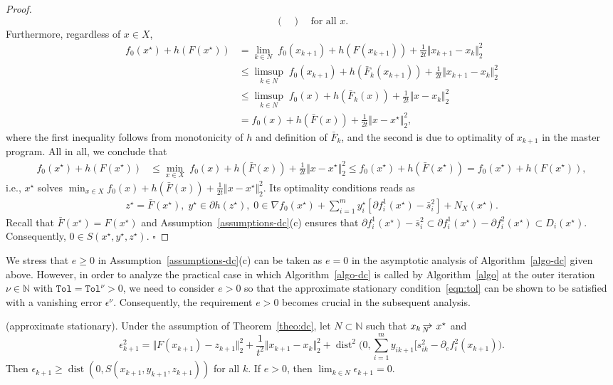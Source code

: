 \documentclass[smallextended,envcountsect]{svjour3}
\newcommand{\norm}[1]{\textstyle{\Vert} #1 \textstyle{\Vert}_2}
\newcommand{\tol}{\texttt{Tol}}
\newcommand{\mybox}{{\hfill $\square$}}
\newcommand{\nats}{\mathbb{N}}
\DeclareMathOperator{\dist}{dist}
\def\Nto{\,{\raise 1pt\hbox{$\rightarrow$}}\kern -12pt
     \hbox{\lower 3pt \hbox{$\, \scriptstyle N$}}\hskip7pt}
\begin{document}
\begin{proof}
\[\begin{pmatrix}
\end{pmatrix}
\quad \mbox{for all $x$.}
\] 
 Furthermore, regardless of $x\in X$,
\begin{align*}
f_0 (x^\star) + h(F(x^\star))  & = \lim_{k \in N }
\;f_0 (x_{k+1}) + h(F(x_{k+1}))+\frac{1}{2t}\norm{x_{k+1}- x_k}^2 \\
& 
     \leq \limsup_{k \in N }
\;f_0 (x_{k+1}) + h(\bar F_k(x_{k+1}))+\frac{1}{2t}\norm{x_{k+1}- x_k}^2 \\
 & \leq \limsup_{k \in N }
\;f_0 (x) + h(\bar F_k(x))+\frac{1}{2t}\norm{x- x_k}^2  \\
&= f_0(x) +h(\bar F(x))+\frac{1}{2t}\norm{x-x^\star}^2,
\end{align*}
where the first inequality follows from monotonicity of $h$ and definition of $\bar F_k$, and the second is due to optimality of $x_{k+1}$ in the master program.
All in all, we conclude that
 \begin{align*}
 f_0 (x^\star) + h(F(x^\star ))   & \leq  \min_{x \in X} \; f_0(x) +h(\bar F(x))+\frac{1}{2t}\norm{x-x^\star}^2
  \leq f_0(x^\star) +h(\bar F(x^\star))
 = f_0 (x^\star) + h(F(x^\star)),
 \end{align*}
 i.e., $x^\star$ solves $\min_{x \in X}  f_0(x) +h(\bar F(x))+\frac{1}{2t}\norm{x-x^\star}^2$. 
 Its optimality conditions reads as
 \begin{align*}
z^\star =\bar F(x^\star), \;
 y^\star \in \partial h(z^\star), \;
0  \in \nabla f_0(x^\star) + \sum_{i=1}^m y^\star_{i} [\partial f_i^1(x^\star)-\bar s^2_{i}]  +N_X(x^\star). 
\end{align*}
 Recall that $\bar F(x^\star)= F(x^\star)$ and Assumption~\ref{assumptions-dc}(c) ensures that $\partial f_i^1(x^\star)-\bar s^2_{i} \subset \partial f_i^1(x^\star)-\partial f^2_i(x^\star) \subset  D_i(x^\star)$. Consequently, $0 \in S(x^\star,y^\star,z^\star)$. \mybox
 \end{proof}
We stress that $e \ge 0$ in Assumption~\ref{assumptions-dc}(c) can be taken as $e = 0$ in the  asymptotic analysis of Algorithm~\ref{algo-dc} given above. However, in order to analyze the practical case in which Algorithm~\ref{algo-dc} is called by Algorithm~\ref{algo} at the outer iteration $\nu \in \nats$ with $\tol = \tol^\nu > 0$, we need to consider $e > 0$ so that the approximate stationary condition~\eqref{eqn:tol} can be shown to be satisfied with a vanishing error $\epsilon^\nu$. Consequently, the requirement $e > 0$ becomes crucial in the subsequent analysis.
%
\begin{proposition}\label{prop:dc}{\rm (approximate stationary).}
Under the assumption of Theorem~\ref{theo:dc}, let $N\subset \nats$ such that
$
 x_{k} \Nto  x^\star $ and
\[
\epsilon_{k+1}^2 =  \norm{F(x_{k+1})-z_{k+1}}^2+\frac{1}{t^2}\norm{x_{k+1}-x_k}^2+\dist^2\Big(0,\sum_{i=1}^my_{ik+1}[s^2_{ik} -\partial_{e} f^2_i(x_{k+1})\Big).
\]
Then
$\epsilon_{k+1} \geq  \dist(0,S(x_{k+1},y_{k+1},z_{k+1}))$ for all $k$. If $e>0$, then  $\lim_{k \in N} \epsilon_{k+1} =0$.
\end{proposition}
\end{document}
